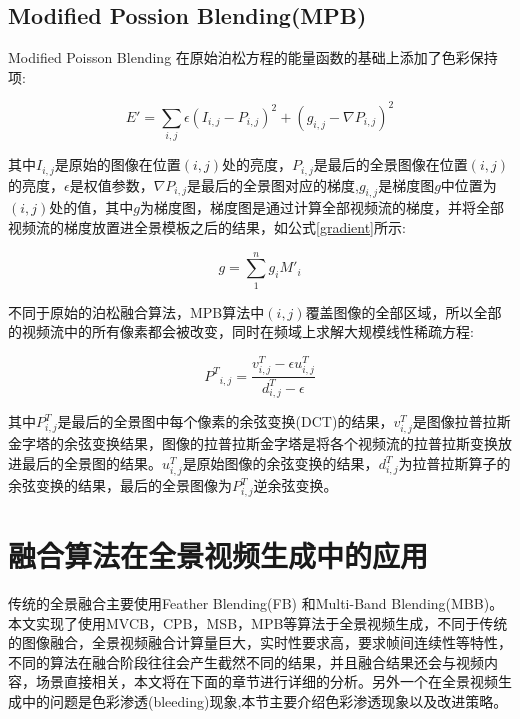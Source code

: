 \subsection{Modified Possion Blending(MPB)}
Modified Poisson Blending 在原始泊松方程的能量函数的基础上添加了色彩保持项:
\begin{center}
    \begin{equation}\label{mpb}
       E'=\underset{i,j}{\sum}\epsilon(I_{i,j}-P_{i,j})^2+(g_{i,j}-\nabla P_{i,j})^2
    \end{equation}
\end{center}
其中$I_{i,j}$是原始的图像在位置$(i,j)$处的亮度，$P_{i,j}$是最后的全景图像在位置$(i,j)$的亮度，$\epsilon$是权值参数，$\nabla P_{i,j}$是最后的全景图对应的梯度,$g_{i,j}$是梯度图$g$中位置为$(i,j)$处的值，其中$g$为梯度图，梯度图是通过计算全部视频流的梯度，并将全部视频流的梯度放置进全景模板之后的结果，如公式\ref{gradient}所示:
\begin{center}
    \begin{equation}\label{gradient}
        g=\sum_{1}^{n}g_i{M'}_i
    \end{equation}
\end{center}
不同于原始的泊松融合算法，MPB算法中$(i,j)$覆盖图像的全部区域，所以全部的视频流中的所有像素都会被改变，同时在频域上求解大规模线性稀疏方程:
\begin{center}
    \begin{equation}\label{fsolve}
        P^T{_{i,j}}=\frac{v^T_{i,j}-\epsilon u^T_{i,j}}{d^T_{i,j}-\epsilon}
    \end{equation}
\end{center}
其中$P^T_{i,j}$是最后的全景图中每个像素的余弦变换(DCT)的结果，$v^T_{i,j}$是图像拉普拉斯金字塔的余弦变换结果，图像的拉普拉斯金字塔是将各个视频流的拉普拉斯变换放进最后的全景图的结果。$u^T_{i,j}$是原始图像的余弦变换的结果，$d^T_{i,j}$为拉普拉斯算子的余弦变换的结果，最后的全景图像为$P^T_{i,j}$逆余弦变换。

\section{融合算法在全景视频生成中的应用}
\indent 传统的全景融合主要使用Feather Blending(FB) 和Multi-Band Blending(MBB)。本文实现了使用MVCB，CPB，MSB，MPB等算法于全景视频生成，不同于传统的图像融合，全景视频融合计算量巨大，实时性要求高，要求帧间连续性等特性，不同的算法在融合阶段往往会产生截然不同的结果，并且融合结果还会与视频内容，场景直接相关，本文将在下面的章节进行详细的分析。另外一个在全景视频生成中的问题是色彩渗透(bleeding)现象,本节主要介绍色彩渗透现象以及改进策略。
